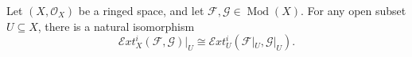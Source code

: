 Let $(X,\mathcal{O}_X)$ be a ringed space, and let $\mathcal{F},\mathcal{G} \in \operatorname{Mod}(X)$. For any open subset $U \subseteq X$, there is a natural isomorphism
$$\mathcal{E}xt^i_X(\mathcal{F},\mathcal{G})|_U \cong \mathcal{E}xt^i_U(\mathcal{F}|_U,\mathcal{G}|_U).$$

